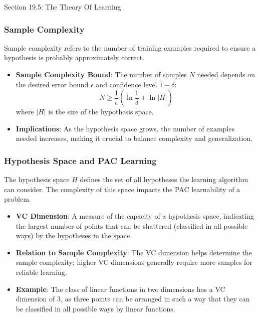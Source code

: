 \begin{notes}{Section 19.5: The Theory Of Learning}
    \subsubsection*{Sample Complexity}
    
    Sample complexity refers to the number of training examples required to ensure a hypothesis is probably approximately correct.
    
    \begin{highlight}
    
        \begin{itemize}
            \item \textbf{Sample Complexity Bound}: The number of samples $N$ needed depends on the desired error bound $\epsilon$ and confidence level $1 - \delta$:
            \[
            N \geq \frac{1}{\epsilon} \left(\ln \frac{1}{\delta} + \ln |H|\right)
            \]
            where $|H|$ is the size of the hypothesis space.
            \item \textbf{Implications}: As the hypothesis space grows, the number of examples needed increases, making it crucial to balance complexity and generalization.
        \end{itemize}
    
    \end{highlight}
    
    \subsubsection*{Hypothesis Space and PAC Learning}
    
    The hypothesis space $H$ defines the set of all hypotheses the learning algorithm can consider. The complexity of this space impacts the PAC learnability of a problem.
    
    \begin{highlight}
    
        \begin{itemize}
            \item \textbf{VC Dimension}: A measure of the capacity of a hypothesis space, indicating the largest number of points that can be shattered (classified in all possible ways) by the hypotheses in the space.
            \item \textbf{Relation to Sample Complexity}: The VC dimension helps determine the sample complexity; higher VC dimensions generally require more samples for reliable learning.
            \item \textbf{Example}: The class of linear functions in two dimensions has a VC dimension of 3, as three points can be arranged in such a way that they can be classified in all possible ways by linear functions.
        \end{itemize}
    

\end{highlight}
\end{notes}
